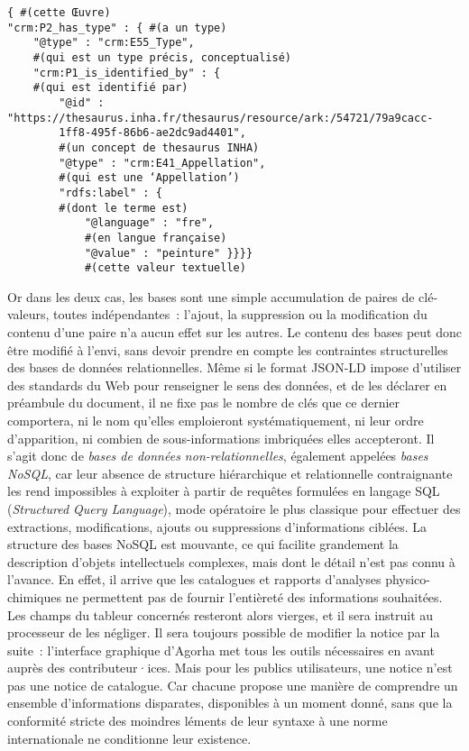 \documentclass[a4paper,12pt, twoside]{book}
\begin{document}
\begin{verbatim}
{ #(cette Œuvre)
"crm:P2_has_type" : { #(a un type)
    "@type" : "crm:E55_Type",
    #(qui est un type précis, conceptualisé)
    "crm:P1_is_identified_by" : {
    #(qui est identifié par)
        "@id" : "https://thesaurus.inha.fr/thesaurus/resource/ark:/54721/79a9cacc-
        1ff8-495f-86b6-ae2dc9ad4401",
        #(un concept de thesaurus INHA)
        "@type" : "crm:E41_Appellation",
        #(qui est une ‘Appellation’)
        "rdfs:label" : {
        #(dont le terme est)
            "@language" : "fre",
            #(en langue française)
            "@value" : "peinture" }}}}
            #(cette valeur textuelle)
\end{verbatim}

Or dans les deux cas, les bases sont une simple accumulation de paires de clé-valeurs, toutes indépendantes~: l’ajout, la suppression ou la modification du contenu d’une paire n’a aucun effet sur les autres. Le contenu des bases peut donc être modifié à l’envi, sans devoir prendre en compte les contraintes structurelles des bases de données relationnelles. Même si le format JSON-LD impose d’utiliser des standards du Web pour renseigner le sens des données, et de les déclarer en préambule du document, il ne fixe pas le nombre de clés que ce dernier comportera, ni le nom qu’elles emploieront systématiquement, ni leur ordre d’apparition, ni combien de sous-informations imbriquées elles accepteront. Il s’agit donc de \textit{bases de données non-relationnelles}, également appelées \textit{bases NoSQL}, car leur absence de structure hiérarchique et relationnelle contraignante les rend impossibles à exploiter à partir de requêtes formulées en langage SQL (\emph{Structured Query Language}), mode opératoire le plus classique pour effectuer des extractions, modifications, ajouts ou suppressions d’informations ciblées. La structure des bases NoSQL est mouvante, ce qui facilite grandement la description d’objets intellectuels complexes, mais dont le détail n’est pas connu à l’avance. En effet, il arrive que les catalogues et rapports d’analyses physico-chimiques ne permettent pas de fournir l’entièreté des informations souhaitées. Les champs du tableur concernés resteront alors vierges, et il sera instruit au processeur de les négliger. Il sera toujours possible de modifier la notice par la suite~: l’interface graphique d’Agorha met tous les outils nécessaires en avant auprès des contributeur·ices. Mais pour les publics utilisateurs, une notice n’est pas une notice de catalogue. Car chacune propose une manière de comprendre un ensemble d’informations disparates, disponibles à un moment donné, sans que la conformité stricte des moindres léments de leur syntaxe à une norme internationale ne conditionne leur existence.
\end{document}
